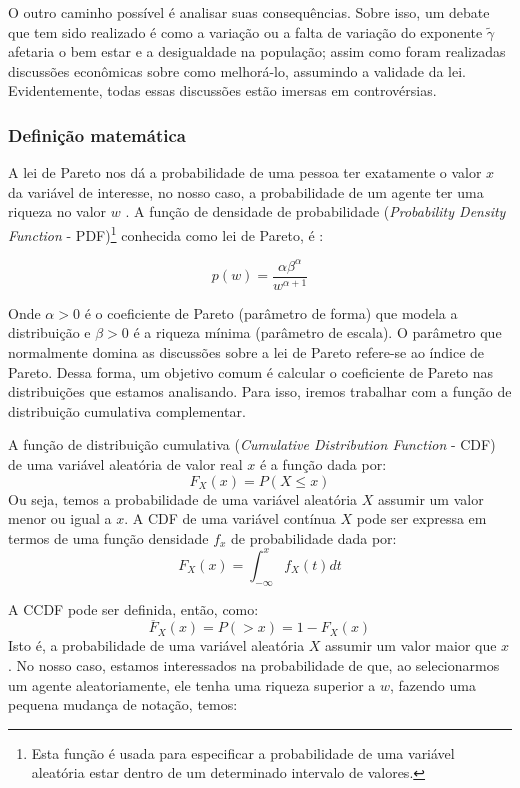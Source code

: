O outro caminho possível é analisar suas consequências. Sobre isso, um debate que tem sido realizado é como a variação ou a falta de variação do  exponente $\tilde{\gamma}$ afetaria o bem estar e a desigualdade na população; assim como foram realizadas discussões econômicas sobre como melhorá-lo, assumindo a validade da lei. Evidentemente, todas essas discussões estão imersas em controvérsias.


  
\subsubsection*{Definição matemática}
A lei de Pareto nos dá a probabilidade de uma pessoa ter exatamente o valor $x$ da variável de interesse, no nosso caso, a probabilidade de um agente ter uma riqueza no valor $w$ . A função de densidade de probabilidade (\textit{Probability Density Function} - PDF)\footnote{Esta função é usada para especificar a probabilidade de uma variável aleatória estar dentro de um determinado intervalo de valores.}  conhecida como lei de Pareto, é \cite{pedroso}:

$$p\left(w\right)=\frac{\alpha\beta^{\alpha}}{w^{\alpha+1}}$$

Onde $\alpha >0$ é o coeficiente de Pareto (parâmetro de forma) que modela a distribuição e $\beta >0$ é a riqueza mínima (parâmetro de escala). O parâmetro que normalmente domina as discussões sobre a lei de Pareto refere-se ao índice de Pareto. Dessa forma, um objetivo comum é calcular o coeficiente de Pareto nas distribuições que estamos analisando. Para isso, iremos trabalhar com a função de distribuição cumulativa complementar.  

A função de distribuição cumulativa (\textit{Cumulative Distribution Function }- CDF) de uma variável aleatória de valor real $x$ é a função dada por:
$$F_{X}\left(x\right)=P\left(X\leq x\right)$$
Ou seja, temos a probabilidade de uma variável aleatória $X$ assumir um valor menor ou igual a $x$. A CDF de uma variável contínua $X$  pode ser expressa em termos de uma função densidade $f_x$ de probabilidade dada por:
$$F_{X}\left(x\right)=\int_{-\infty}^{x}f_{X}\left(t\right)dt$$

A CCDF pode ser definida, então, como:
$$\overline{F}_{X}\left(x\right)=P\left(>x\right)=1-F_{X}\left(x\right)$$
Isto é, a probabilidade de uma variável aleatória $X$ assumir um valor maior que  $x$. No nosso caso,  estamos interessados na probabilidade de que, ao selecionarmos um agente aleatoriamente, ele tenha uma riqueza superior a $w$, fazendo uma pequena mudança de notação, temos:


